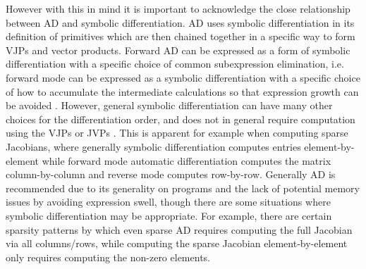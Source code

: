 However with this in mind it is important to acknowledge the close relationship between AD and symbolic differentiation.
AD uses symbolic differentiation in its definition of primitives which are then chained together in a specific way to form VJPs and vector products. 
Forward AD can be expressed as a form of symbolic differentiation with a specific choice of common subexpression elimination, i.e. forward mode can be expressed as a symbolic differentiation with a specific choice of how to accumulate the intermediate calculations so that expression growth can be avoided \cite{juedes1991taxonomy, Elliott_2018, Laue2020, Dürrbaum_Klier_Hahn_2002}.
However, general symbolic differentiation can have many other choices for the differentiation order, and does not in general require computation using the VJPs or JVPs \cite{Baydin_Pearlmutter_Radul_Siskind_2015}. 
This is apparent for example when computing sparse Jacobians, where generally symbolic differentiation computes entries element-by-element while forward mode automatic differentiation computes the matrix column-by-column and reverse mode computes row-by-row. 
Generally AD is recommended due to its generality on programs and the lack of potential memory issues by avoiding expression swell, though there are some situations where symbolic differentiation may be appropriate. 
For example, there are certain sparsity patterns by which even sparse AD requires computing the full Jacobian via all columns/rows, while computing the sparse Jacobian element-by-element only requires computing the non-zero elements.
